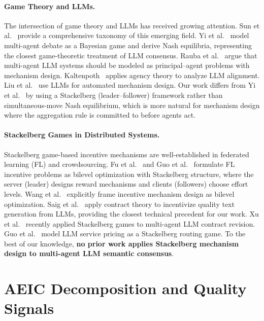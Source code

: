 \documentclass[runningheads]{llncs}
\begin{document}
\paragraph{Game Theory and LLMs.}
The intersection of game theory and LLMs has received growing attention. Sun et al.~\cite{sun2025gametheory} provide a comprehensive taxonomy of this emerging field. Yi et al.~\cite{yi2025debate} model multi-agent debate as a Bayesian game and derive Nash equilibria, representing the closest game-theoretic treatment of LLM consensus. Rauba et al.~\cite{rauba2025principal} argue that multi-agent LLM systems should be modeled as principal--agent problems with mechanism design. Kaltenpoth~\cite{kaltenpoth2025agency} applies agency theory to analyze LLM alignment. Liu et al.~\cite{liu2025interpretable} use LLMs for automated mechanism design. Our work differs from Yi et al.~\cite{yi2025debate} by using a Stackelberg (leader--follower) framework rather than simultaneous-move Nash equilibrium, which is more natural for mechanism design where the aggregation rule is committed to before agents act.

\paragraph{Stackelberg Games in Distributed Systems.}
Stackelberg game-based incentive mechanisms are well-established in federated learning (FL) and crowdsourcing. Fu et al.~\cite{fu2024stackelberg} and Guo et al.~\cite{guo2023incentive} formulate FL incentive problems as bilevel optimization with Stackelberg structure, where the server (leader) designs reward mechanisms and clients (followers) choose effort levels. Wang et al.~\cite{wang2024incentive} explicitly frame incentive mechanism design as bilevel optimization. Saig et al.~\cite{saig2024incentivizing} apply contract theory to incentivize quality text generation from LLMs, providing the closest technical precedent for our work. Xu et al.~\cite{xu2026rcbsf} recently applied Stackelberg games to multi-agent LLM contract revision. Guo et al.~\cite{guo2026pricing} model LLM service pricing as a Stackelberg routing game. To the best of our knowledge, \textbf{no prior work applies Stackelberg mechanism design to multi-agent LLM semantic consensus}.

\section{AEIC Decomposition and Quality Signals}
\label{sec:aeic}
\end{document}
